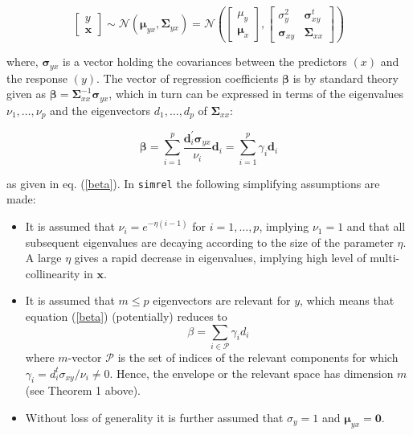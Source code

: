 \documentclass[a4paper, 11pt]{article}
\begin{document}
\begin{equation}
  \label{eq:rand-reg-model}
  \begin{bmatrix}
    y \\ \mathbf{x}
  \end{bmatrix} \sim
  \mathcal{N}\left( \boldsymbol{\mu}_{yx}, \boldsymbol{\Sigma}_{yx} \right) =
  \mathcal{N}\left(
    \begin{bmatrix}
      \mu_y \\ \boldsymbol{\mu}_x
    \end{bmatrix},
    \begin{bmatrix}
      \sigma_y^2               & \boldsymbol{\sigma}_{xy}^t \\
      \boldsymbol{\sigma}_{xy} & \boldsymbol{\Sigma}_{xx}
    \end{bmatrix}
  \right)
\end{equation}

where, $\boldsymbol{\sigma}_{yx}$ is a vector holding the covariances between the predictors $(x)$ and the response $(y)$. The vector of regression coefficients  $\boldsymbol{\beta}$ is by standard theory given as $\boldsymbol{\beta} = \boldsymbol{\Sigma}_{xx}^{-1}\boldsymbol{\sigma}_{yx}$, which in turn can be expressed in terms of the eigenvalues $\nu_1, \ldots, \nu_p$ and the eigenvectors $d_1, \ldots, d_p$ of $\boldsymbol{\Sigma}_{xx}$:

\begin{equation}
\boldsymbol{\beta} = \sum_{i=1}^p \frac{\boldsymbol{d}_i^{'}\boldsymbol{\sigma}_{yx}}{\nu_i}\boldsymbol{d}_i = \sum_{i=1}^p\gamma_i \boldsymbol{d}_i
\end{equation} 

as given in eq. (\ref{beta}). In {\tt simrel} the following simplifying assumptions are made: 

\begin{itemize}[label=$\triangleright$]
\item It is assumed that $\nu_{i} = e^{-\eta(i-1)}$ for $i=1, \ldots, p$, implying $\nu_1=1$ and that all subsequent eigenvalues are decaying according to the size of the parameter $\eta$.  A large $\eta$ gives a rapid decrease in eigenvalues, implying high level of multi-collinearity in $\boldsymbol{x}$.
\item It is assumed that $m \le p$ eigenvectors are relevant for $y$, which means that equation (\ref{beta}) (potentially) reduces to
 \begin{equation}
   \label{eq:relevant-beta}
   \beta = \sum_{i \in \mathcal{P}}{\gamma_i d_i}
 \end{equation}
 where $m$-vector $\mathcal{P}$ is the set of indices of the relevant components for which $\gamma_i = d_i^t \sigma_{xy}/\nu_i \ne 0$. Hence, the envelope or the relevant space has dimension $m$ (see Theorem 1 above).
\item Without loss of generality it is further assumed that $\sigma_y=1$ and $\boldsymbol{\mu}_{yx}=\boldsymbol{0}$.
\end{itemize}
\end{document}
